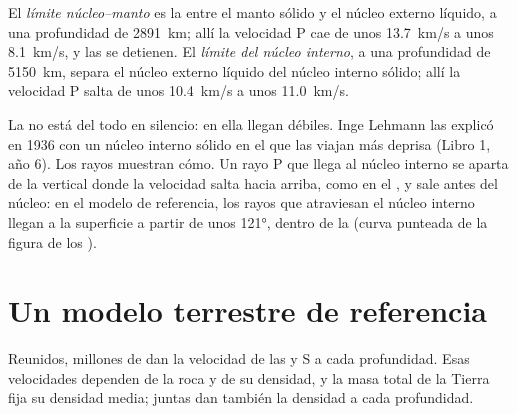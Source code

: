 \begin{definition}\label{def:g11:seismic-structure:core}
El \emph{límite núcleo--manto}
es la  entre el manto sólido y el núcleo externo
líquido, a una profundidad de \qty{2891}{km}; allí la velocidad P cae de unos
\qty{13.7}{km/s} a unos \qty{8.1}{km/s}, y las  se detienen. El
\emph{límite del núcleo
interno}, a una
profundidad de \qty{5150}{km}, separa el núcleo externo líquido del núcleo
interno sólido; allí la velocidad P salta de unos \qty{10.4}{km/s} a unos
\qty{11.0}{km/s}.
\end{definition}

La  no está del todo en silencio: en ella llegan 
débiles. Inge Lehmann las explicó en 1936 con un núcleo interno sólido en el
que las  viajan más deprisa (Libro 1, año 6). Los rayos muestran cómo.
Un rayo P que llega al núcleo interno se aparta de la vertical donde la
velocidad salta hacia arriba, como en el , y sale antes del núcleo: en el
modelo de referencia, los rayos que atraviesan el núcleo interno llegan a la
superficie a partir de unos \ang{121}, dentro de la  (curva
punteada de la figura de los ).

\section{Un modelo terrestre de referencia}\label{sec:g11:seismic-structure:model}

Reunidos, millones de  dan la velocidad de las  y
S a cada profundidad. Esas velocidades dependen de la roca y de su densidad,
y la masa total de la Tierra fija su densidad media; juntas dan también la
densidad a cada profundidad.

